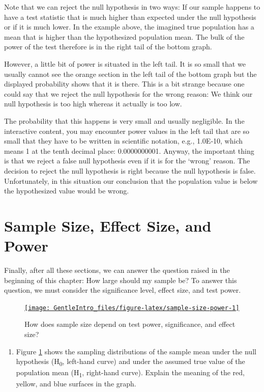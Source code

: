 \documentclass[a4paper]{book}
\providecommand{\tightlist}{%
  \setlength{\itemsep}{0pt}\setlength{\parskip}{0pt}}
\theoremstyle{definition}
\theoremstyle{definition}
\theoremstyle{definition}
\theoremstyle{remark}
\begin{document}
Note that we can reject the null hypothesis in two ways: If our sample
happens to have a test statistic that is much higher than expected under
the null hypothesis or if it is much lower. In the example above, the
imagined true population has a mean that is higher than the hypothesized
population mean. The bulk of the power of the test therefore is in the
right tail of the bottom graph.

However, a little bit of power is situated in the left tail. It is so
small that we usually cannot see the orange section in the left tail of
the bottom graph but the displayed probability shows that it is there.
This is a bit strange because one could say that we reject the null
hypothesis for the wrong reason: We think our null hypothesis is too
high whereas it actually is too low.

The probability that this happens is very small and usually negligible.
In the interactive content, you may encounter power values in the left
tail that are so small that they have to be written in scientific
notation, e.g., 1.0E-10, which means 1 at the tenth decimal place:
0.0000000001. Anyway, the important thing is that we reject a false null
hypothesis even if it is for the `wrong' reason. The decision to reject
the null hypothesis is right because the null hypothesis is false.
Unfortunately, in this situation our conclusion that the population
value is below the hypothesized value would be wrong.

\section{Sample Size, Effect Size, and
Power}\label{sample-size-effect-size-and-power}

Finally, after all these sections, we can answer the question raised in
the beginning of this chapter: How large should my sample be? To answer
this question, we must consider the significance level, effect size, and
test power.

\begin{figure}[H]
\href{http://82.196.4.233:3838/apps/sample-size-power/}{\texttt{[image: GentleIntro\_files/figure-latex/sample-size-power-1]} }\caption{How does sample size depend on test power, significance, and effect size?}\label{fig:sample-size-power}
\end{figure}

\begin{enumerate}
\def\labelenumi{\arabic{enumi}.}
\tightlist
\item
  Figure \ref{fig:sample-size-power} shows the sampling distributions of
  the sample mean under the null hypothesis (H\textsubscript{0},
  left-hand curve) and under the assumed true value of the population
  mean (H\textsubscript{1}, right-hand curve). Explain the meaning of
  the red, yellow, and blue surfaces in the graph.
\end{enumerate}
\end{document}
